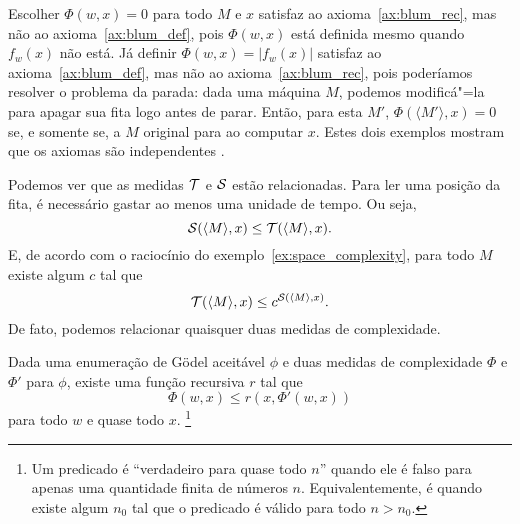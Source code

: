 \begin{example}
    Escolher $\Phi(w, x) = 0$ para todo $M$ e $x$
    satisfaz ao axioma~\ref{ax:blum_rec},
    mas não ao axioma~\ref{ax:blum_def},
    pois $\Phi(w, x)$ está definida mesmo quando $f_w(x)$ não está.
    Já definir $\Phi(w, x) = |f_w(x)|$
    satisfaz ao axioma~\ref{ax:blum_def},
    mas não ao axioma~\ref{ax:blum_rec},
    pois poderíamos resolver o problema da parada:
    dada uma máquina $M$, podemos modificá"=la
    para apagar sua fita logo antes de parar.
    Então, para esta $M'$,
    $\Phi(\langle M' \rangle, x) = 0$ se, e somente se,
    a $M$ original para ao computar $x$.
    Estes dois exemplos mostram que os axiomas são independentes
    \cite[p.~324]{Blum1967}.
\end{example}

Podemos ver que as medidas ${\mathcal{T}}$ e ${\mathcal{S}}$ estão relacionadas.
Para ler uma posição da fita,
é necessário gastar ao menos uma unidade de tempo.
Ou seja,
\begin{equation*}
    {\mathcal{S}}(\langle M \rangle, x) \leq {\mathcal{T}}(\langle M \rangle, x).
\end{equation*}
E, de acordo com o raciocínio do exemplo~\ref{ex:space_complexity},
para todo $M$ existe algum $c$ tal que
\begin{equation*}
    {\mathcal{T}}(\langle M \rangle, x) \leq c^{{\mathcal{S}}(\langle M \rangle, x)}.
\end{equation*}
De fato, podemos relacionar quaisquer duas medidas de complexidade.

\begin{theorem}
    \label{thm:measure_related}
    Dada uma enumeração de Gödel aceitável $\phi$
    e duas medidas de complexidade $\Phi$ e $\Phi'$ para $\phi$,
    existe uma função recursiva $r$ tal que
    \begin{equation*}
        \Phi(w, x) \leq r( x, \Phi'(w, x))
    \end{equation*}
    para todo $w$ e quase todo $x$.%
    \footnote{
        Um predicado é ``verdadeiro para quase todo $n$''
        quando ele é falso para apenas uma quantidade finita de números $n$.
        Equivalentemente,
        é quando existe algum $n_0$ tal que
        o predicado é válido para todo $n > n_0$.
    }
\end{theorem}

